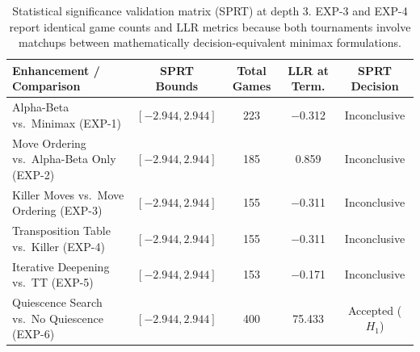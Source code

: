 \begin{table}[htbp]
\centering
\caption[Statistical Significance Validation Matrix (SPRT)]{Statistical significance validation matrix (SPRT) at depth 3. EXP-3 and EXP-4 report identical game counts and LLR metrics because both tournaments involve matchups between mathematically decision-equivalent minimax formulations.}
\label{tab:statistical_validation}
\begin{tabularx}{\textwidth}{X c c c c}
\toprule
\textbf{Enhancement / Comparison}  &  \textbf{SPRT Bounds}  &  \textbf{Total Games}  &  \textbf{LLR at Term.}  &  \textbf{SPRT Decision} \\
\midrule
Alpha-Beta vs.\ Minimax (EXP-1)            & $[-2.944, 2.944]$ & 223 & $-$0.312 & Inconclusive \\
Move Ordering vs.\ Alpha-Beta Only (EXP-2) & $[-2.944, 2.944]$ & 185 & 0.859  & Inconclusive \\
Killer Moves vs.\ Move Ordering (EXP-3)    & $[-2.944, 2.944]$ & 155 & $-$0.311 & Inconclusive \\
Transposition Table vs.\ Killer (EXP-4)   & $[-2.944, 2.944]$ & 155 & $-$0.311 & Inconclusive \\
Iterative Deepening vs.\ TT (EXP-5)        & $[-2.944, 2.944]$ & 153 & $-$0.171 & Inconclusive \\
Quiescence Search vs.\ No Quiescence (EXP-6) & $[-2.944, 2.944]$ & 400 & 75.433 & Accepted ($H_1$) \\
\bottomrule
\end{tabularx}
\end{table}


